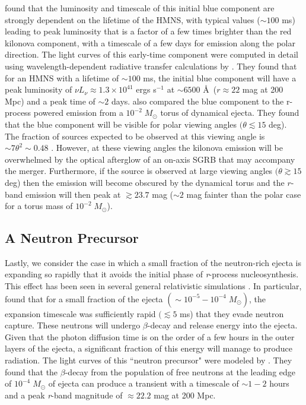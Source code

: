 \citet{MetzgerFernandez14} found that the luminosity and timescale of this initial blue component are strongly dependent on the lifetime of the HMNS, with typical values ($\sim 100$ ms) leading to peak luminosity that is a factor of a few times brighter than the red kilonova component, with a timescale of a few days for emission along the polar direction. The light curves of this early-time component were computed in detail using wavelength-dependent radiative transfer calculations by \citet{Kasen+15}. They found that for an HMNS with a lifetime of $\sim100$ ms, the initial blue component will have a peak luminosity of $\nu L_{\nu} \approx 1.3\times10^{41}$ ergs s$^{-1}$ at $\sim6500$ \AA\,  ($r \approx 22$ mag at 200 Mpc) and a peak time of $\sim2$ days. \citet{Kasen+15} also compared the blue component to the r-process powered emission from a $10^{-2}\;M_{\odot}$ torus of dynamical ejecta. They found that the blue component will be visible for polar viewing angles $(\theta \lesssim 15$ deg). The fraction of sources expected to be observed at this viewing angle is $\sim7\theta^2\sim0.48$ \citep{MetzgerBerger12}. However, at these viewing angles the kilonova emission will be overwhelmed by the optical afterglow of an on-axis SGRB that may accompany the merger. Furthermore, if the source is observed at large viewing angles $(\theta \gtrsim 15$ deg) then the emission will become obscured by the dynamical torus and the $r$-band emission will then peak at $\gtrsim 23.7$ mag ($\sim2$ mag fainter than the polar case for a torus mass of $10^{-2}\;M_{\odot}$).

\subsection{A Neutron Precursor}
\label{sec:ch2_neutronpre}
Lastly, we consider the case in which a small fraction of the neutron-rich ejecta is expanding so rapidly that it avoids the initial phase of {\em r}-process nucleosynthesis. This effect has been seen in several general relativistic simulations \citep{Bauswein+13b,Goriely+15,Just+15}. In particular, \citet{Bauswein+13b} found that for a small fraction of the ejecta $(\sim 10^{-5} - 10^{-4}\; M_{\odot})$, the expansion timescale was sufficiently rapid $(\lesssim 5$ ms) that they evade neutron capture. These neutrons will undergo $\beta$-decay and release energy into the ejecta. Given that the photon diffusion time is on the order of a few hours in the outer layers of the ejecta, a significant fraction of this energy will manage to produce radiation. The light curves of this ``neutron precursor" were modeled by \citet{Metzger+15}. They found that the $\beta$-decay from the population of free neutrons at the leading edge of $10^{-4}\;M_{\odot}$ of ejecta can produce a transient with a timescale of $\sim1-2$ hours and a peak {\em r}-band magnitude of $\approx 22.2$ mag at 200 Mpc.

